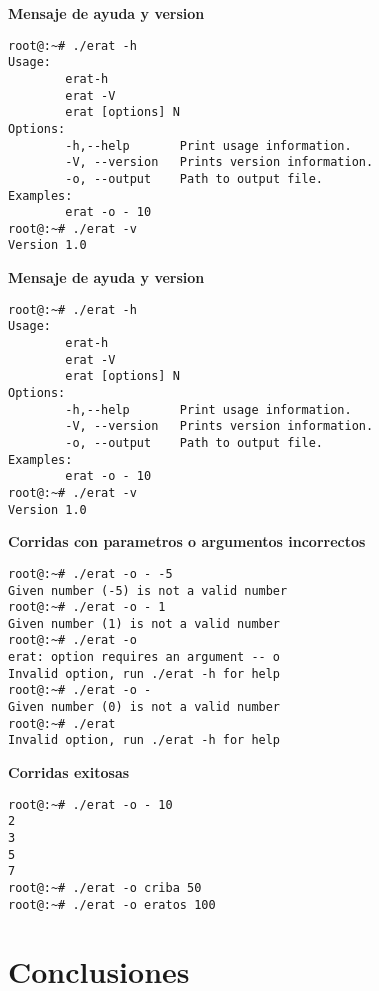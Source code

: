 \documentclass[a4paper,10pt]{article}
\begin{document}
\vspace{0.5cm}
\textbf{Mensaje de ayuda y version}
\lstset{language=bash, breaklines=true, , basicstyle=\footnotesize}
\begin{lstlisting}[frame = single]
root@:~# ./erat -h
Usage:
        erat-h 
        erat -V 
        erat [options] N 
Options:
        -h,--help       Print usage information.
        -V, --version   Prints version information.
        -o, --output    Path to output file.
Examples:
        erat -o - 10
root@:~# ./erat -v
Version 1.0
\end{lstlisting}

\vspace{0.5cm}
\textbf{Mensaje de ayuda y version}
\lstset{language=bash, breaklines=true, , basicstyle=\footnotesize}
\begin{lstlisting}[frame = single]
root@:~# ./erat -h
Usage:
        erat-h 
        erat -V 
        erat [options] N 
Options:
        -h,--help       Print usage information.
        -V, --version   Prints version information.
        -o, --output    Path to output file.
Examples:
        erat -o - 10
root@:~# ./erat -v
Version 1.0
\end{lstlisting}
\vspace{0.5cm}

\textbf{Corridas con parametros o argumentos incorrectos}
\lstset{language=bash, breaklines=true, , basicstyle=\footnotesize}
\begin{lstlisting}[frame = single]
root@:~# ./erat -o - -5
Given number (-5) is not a valid number
root@:~# ./erat -o - 1 
Given number (1) is not a valid number
root@:~# ./erat -o 
erat: option requires an argument -- o
Invalid option, run ./erat -h for help
root@:~# ./erat -o -
Given number (0) is not a valid number
root@:~# ./erat     
Invalid option, run ./erat -h for help

\end{lstlisting}

\vspace{0.5cm}
\textbf{Corridas exitosas}
\lstset{language=bash, breaklines=true, , basicstyle=\footnotesize}
\begin{lstlisting}[frame = single]
root@:~# ./erat -o - 10
2
3
5
7
root@:~# ./erat -o criba 50
root@:~# ./erat -o eratos 100
\end{lstlisting}

\section{Conclusiones}
\end{document}
